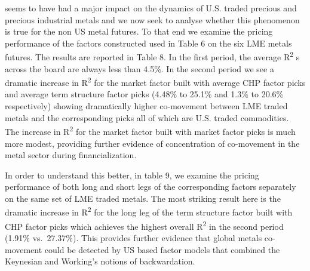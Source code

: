 \documentclass[11pt, letterpaper, doublespacing]{article}
\begin{document}
seems to have had a major impact on the dynamics of U.S. traded precious
and precious industrial metals and we now seek to analyse whether this
phenomenon is true for the non US metal futures. To that end we examine
the pricing performance of the factors constructed used in Table 6 on
the six LME metals futures. The results are reported in Table 8. In the
first period, the average R\textsuperscript{2} s across the board are
always less than 4.5\%. In the second period we see a dramatic increase
in R\textsuperscript{2} for the market factor built with average CHP
factor picks and average term structure factor picks (4.48\% to 25.1\%
and 1.3\% to 20.6\% respectively) showing dramatically higher
co-movement between LME traded metals and the corresponding picks all of
which are U.S. traded commodities. The increase in R\textsuperscript{2}
for the market factor built with market factor picks is much more
modest, providing further evidence of concentration of co-movement in
the metal sector during financialization.

In order to understand this better, in table 9, we examine the pricing
performance of both long and short legs of the corresponding factors
separately on the same set of LME traded metals. The most striking
result here is the dramatic increase in R\textsuperscript{2} for the
long leg of the term structure factor built with CHP factor picks which
achieves the highest overall R\textsuperscript{2} in the second period
(1.91\% vs.~27.37\%). This provides further evidence that global metals
co-movement could be detected by US based factor models that combined
the Keynesian and Working's notions of backwardation.
\end{document}
